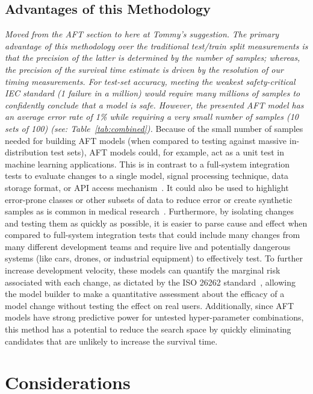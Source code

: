 \documentclass[conference]{IEEEtran}
\newcommand{\cm}[1]{\textit{{\color{blue}#1}}}
\begin{document}
{\subsection{Advantages of this Methodology}
\label{advantages}
\cm{Moved from the AFT section to here at Tommy's suggestion.}
\cm{The primary advantage of this methodology over the traditional test/train split measurements is that the precision of the latter is determined by the number of samples; whereas, the precision of the survival time estimate is driven by the resolution of our timing measurements. For test-set accuracy,  meeting the weakest safety-critical IEC standard (1 failure in a million) would require many millions of samples to confidently conclude that a model is safe. However, the presented AFT model has an average error rate of 1\% while requiring a very small number of samples (10 sets of 100) (see: Table~\ref{tab:combined}).}
Because of the small number of samples needed for building AFT models (when compared to testing against massive in-distribution test sets), AFT models could, for example, act as a unit test in machine learning applications. 
This is in contrast to a full-system integration tests to evaluate changes to a single model, signal processing technique, data storage format, or API access mechanism~\cite{schmoor2000sample,lachin1981introduction}. It could also be used to highlight error-prone classes or other subsets of data to reduce error or create synthetic samples as is common in medical research~\cite{kleinbaum1996survival}. Furthermore, by isolating changes and testing them as quickly as possible, it is easier to parse cause and effect when compared to full-system integration tests that could include many changes from many different development teams and require live and potentially dangerous systems (like cars, drones, or industrial equipment) to effectively test. To further increase development velocity, these models can quantify the marginal risk associated with each change, as dictated by the ISO 26262 standard~\cite{IEC61508}, allowing the model builder to make a quantitative assessment about the efficacy of a model change without testing the effect on real users. Additionally, since AFT models have strong predictive power for untested hyper-parameter combinations, this method has a potential to reduce the search space by quickly eliminating candidates that are unlikely to increase the survival time. 

\section{Considerations}
\label{considerations}

}
\end{document}
